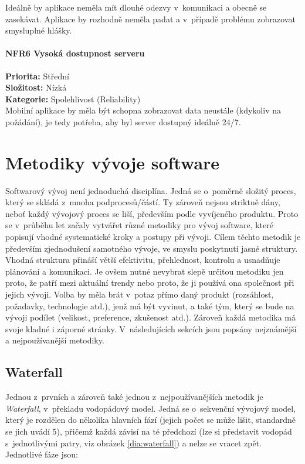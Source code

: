 \documentclass[thesis=M,czech]{FITthesis}[2019/12/23]
\begin{document}
Ideálně by aplikace neměla mít dlouhé odezvy v~komunikaci a obecně se zasekávat. Aplikace by rozhodně neměla padat a v~případě problému zobrazovat smysluplné hlášky.

\subsubsection*{NFR6 Vysoká dostupnost serveru}
\textbf{Priorita:} Střední \\
\textbf{Složitost:} Nízká \\
\textbf{Kategorie:} Spolehlivost (Reliability) \\

Mobilní aplikace by měla být schopna zobrazovat data neustále (kdykoliv na požádání), je tedy potřeba, aby byl server dostupný ideálně 24/7.


\chapter{Metodiky vývoje software}
Softwarový vývoj není jednoduchá disciplína. Jedná se o~poměrně složitý proces, který se skládá z~mnoha podprocesů/částí. Ty zároveň nejsou striktně dány, neboť každý vývojový proces se liší, především podle vyvíjeného produktu. Proto se v~průběhu let začaly vytvářet různé metodiky pro vývoj software, které popisují vhodné systematické kroky a postupy při vývoji. Cílem těchto metodik je především zjednodušení samotného vývoje, ve smyslu poskytnutí jasné struktury. Vhodná struktura přináší větší efektivitu, přehlednost, kontrolu a usnadňuje plánování a komunikaci. Je ovšem nutné nevybrat slepě určitou metodiku jen proto, že patří mezi aktuální trendy nebo proto, že ji používá ona společnost při jejich vývoji. Volba by měla brát v~potaz přímo daný produkt (rozsáhlost, požadavky, technologie atd.), jenž má být vyvinut, a také tým, který se bude na vývoji podílet (velikost, preference, zkušenost atd.). Zároveň každá metodika má svoje kladné i záporné stránky. V~následujících sekcích jsou popsány nejznámější a nejpoužívanější metodiky. \cite{software-development-methodologies-1, software-development-methodologies-2}

\section{Waterfall \cite{waterfall}}
Jednou z~prvních a zároveň také jednou z~nejpoužívanějších metodik je \textit{Waterfall}, v~překladu vodopádový model. Jedná se o~sekvenční vývojový model, který je rozdělen do několika hlavních fází (jejich počet se může lišit, standardně se jich uvádí 5), přičemž každá závisí na té předchozí (lze si představit vodopád s~jednotlivými patry, viz obrázek \ref{dia:waterfall}) a nelze se vracet zpět. Jednotlivé fáze jsou:
\end{document}
